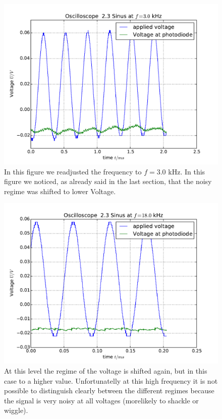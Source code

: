 \begin{figure}
    \includegraphics[width=15cm]{analysis/figures/23sinus01}
    \caption{In this figure we readjusted the frequency to
        $f=3.0$ kHz. In this figure we noticed, as already said
        in the last section, that the noisy regime was shifted
        to lower Voltage.}
\end{figure}

\begin{figure}
    \includegraphics[width=15cm]{analysis/figures/23sinus02}
    \caption{At this level the regime of the voltage is shifted
        again, but in this case to a higher value. Unfortunatelly
        at this high frequency it is not possible to distinguish
        clearly between the different regimes because the signal
        is very noisy at all voltages (morelikely to shackle 
            or wiggle).}
\end{figure}

